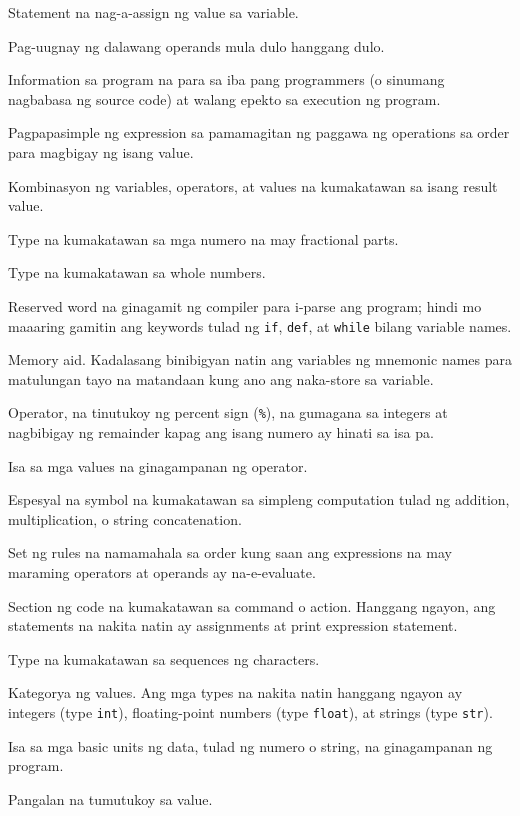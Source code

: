 \documentclass[10pt,]{book}
\providecommand{\tightlist}{%
  \setlength{\itemsep}{0pt}\setlength{\parskip}{0pt}}
\begin{document}
\begin{description}
\tightlist
\item[assignment]
Statement na nag-a-assign ng value sa variable. 
\item[concatenate]
Pag-uugnay ng dalawang operands mula dulo hanggang dulo.
\item[comment]
Information sa program na para sa iba pang programmers (o sinumang
nagbabasa ng source code) at walang epekto sa execution ng program.
\item[evaluate]
Pagpapasimple ng expression sa pamamagitan ng paggawa ng operations sa
order para magbigay ng isang value.
\item[expression]
Kombinasyon ng variables, operators, at values na kumakatawan sa isang
result value. 
\item[floating point]
Type na kumakatawan sa mga numero na may fractional parts.
\item[integer]
Type na kumakatawan sa whole numbers. 
\item[keyword]
Reserved word na ginagamit ng compiler para i-parse ang program; hindi
mo maaaring gamitin ang keywords tulad ng \texttt{if}, \texttt{def}, at
\texttt{while} bilang variable names. 
\item[mnemonic]
Memory aid. Kadalasang binibigyan natin ang variables ng mnemonic names
para matulungan tayo na matandaan kung ano ang naka-store sa variable.
\item[modulus operator]
Operator, na tinutukoy ng percent sign (\texttt{\%}), na gumagana sa
integers at nagbibigay ng remainder kapag ang isang numero ay hinati sa
isa pa.  
\item[operand]
Isa sa mga values na ginagampanan ng operator. 
\item[operator]
Espesyal na symbol na kumakatawan sa simpleng computation tulad ng
addition, multiplication, o string concatenation. 
\item[rules of precedence]
Set ng rules na namamahala sa order kung saan ang expressions na may
maraming operators at operands ay na-e-evaluate.
 
\item[statement]
Section ng code na kumakatawan sa command o action. Hanggang ngayon, ang
statements na nakita natin ay assignments at print expression statement.
\item[string]
Type na kumakatawan sa sequences ng characters. 
\item[type]
Kategorya ng values. Ang mga types na nakita natin hanggang ngayon ay
integers (type \texttt{int}), floating-point numbers (type
\texttt{float}), at strings (type \texttt{str}). 
\item[value]
Isa sa mga basic units ng data, tulad ng numero o string, na
ginagampanan ng program. 
\item[variable]
Pangalan na tumutukoy sa value. 
\end{description}
\end{document}
